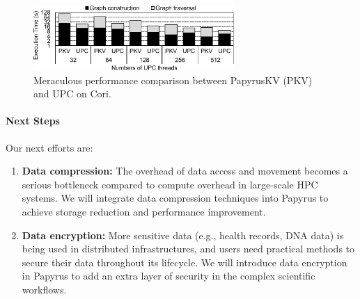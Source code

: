 \begin{figure}[htb]
\centering
\includegraphics[width=3in]{projects/2.3.2-Tools/2.3.2.09-PROTEAS/papyrus-meraculous-eval}
\caption{Meraculous performance comparison between PapyrusKV (PKV) and UPC on Cori.}
\label{fig:papyrus-meraculous-eval}
\end{figure}

\paragraph{Next Steps}
Our next efforts are:

\begin{enumerate}
\item \textbf{Data compression:} The overhead of data access and movement becomes a serious bottleneck compared to compute overhead in large-scale HPC systems. We will integrate data compression techniques into Papyrus to achieve storage reduction and performance improvement. 

\item \textbf{Data encryption:} More sensitive data (e.g., health records, DNA data) is being used in distributed infrastructures, and users need practical methods to secure their data throughout its lifecycle. We will introduce data encryption in Papyrus to add an extra layer of security in the complex scientific workflows.

\end{enumerate}
